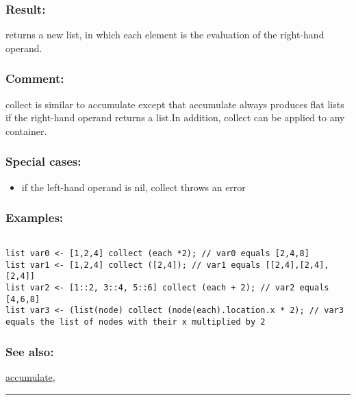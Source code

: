\documentclass[]{book}
\providecommand{\tightlist}{%
  \setlength{\itemsep}{0pt}\setlength{\parskip}{0pt}}
\theoremstyle{definition}
\theoremstyle{definition}
\theoremstyle{definition}
\theoremstyle{remark}
\begin{document}
\subsubsection{Result:}\label{result-88}

returns a new list, in which each element is the evaluation of the
right-hand operand.

\subsubsection{Comment:}\label{comment-21}

collect is similar to accumulate except that accumulate always produces
flat lists if the right-hand operand returns a list.In addition, collect
can be applied to any container.

\subsubsection{Special cases:}\label{special-cases-29}

\begin{itemize}
\tightlist
\item
  if the left-hand operand is nil, collect throws an error
\end{itemize}

\subsubsection{Examples:}\label{examples-69}

\begin{verbatim}
 
list var0 <- [1,2,4] collect (each *2); // var0 equals [2,4,8] 
list var1 <- [1,2,4] collect ([2,4]); // var1 equals [[2,4],[2,4],[2,4]] 
list var2 <- [1::2, 3::4, 5::6] collect (each + 2); // var2 equals [4,6,8] 
list var3 <- (list(node) collect (node(each).location.x * 2); // var3 equals the list of nodes with their x multiplied by 2
\end{verbatim}

\subsubsection{See also:}\label{see-also-55}

\href{OperatorsAA\#accumulate}{accumulate},

\begin{center}\rule{0.5\linewidth}{\linethickness}\end{center}
\end{document}
